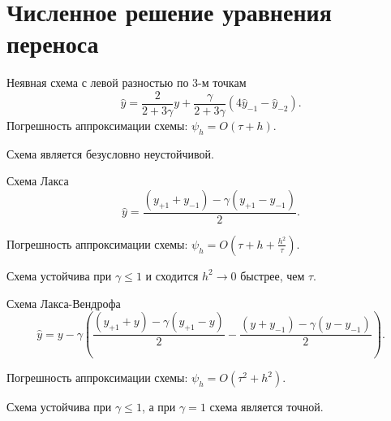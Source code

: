 \documentclass{beamer}
\begin{document}
\section{Численное решение уравнения переноса}
\begin{frame}
	\begin{block}{Неявная схема с левой разностью по 3-м точкам}
	\begin{equation*}
		\widehat{y} = \frac{2}{2 + 3 \gamma} y +\frac{\gamma}{2 + 3 \gamma}( 4 \widehat{y}_{-1} -  \widehat{y}_{-2}).
		\label{s4}
	\end{equation*}
	Погрешность аппроксимации схемы: $\psi_h = O(\tau + h)$.
	
	Схема является безусловно неустойчивой.	
		
	\end{block}
	\begin{block}{Схема Лакса}
	\begin{equation*}
		\widehat{y} = \dfrac{(y_{+1} + y_{-1}) - \gamma(y_{+1} - y_{-1})}{2} .
		\label{s5}
	\end{equation*}
	
	Погрешность аппроксимации схемы: $\psi_h = O(\tau + h + \frac{h^2 }{ \tau})$.
	
	Схема устойчива при $\gamma \leq 1 $ и сходится $h^2 \to 0$ быстрее, чем $\tau$.	
		
	\end{block}
	
	\begin{block}{Схема Лакса-Вендрофа}
	\begin{equation*}
		\widehat{y} = y - \gamma(\dfrac{(y_{+1} + y) - \gamma (y_{+1} - y)}{2} -  \dfrac{(y + y_{-1}) - \gamma (y - y_{-1})}{2}).
		\label{s6}
	\end{equation*}
	
	Погрешность аппроксимации схемы: 
	$\psi_h = O(\tau^2 + h^2)$.
	
	Схема устойчива при $\gamma \leq 1 $, а при $\gamma = 1$ схема является точной. 	
		
	\end{block}
\end{frame}
\end{document}
